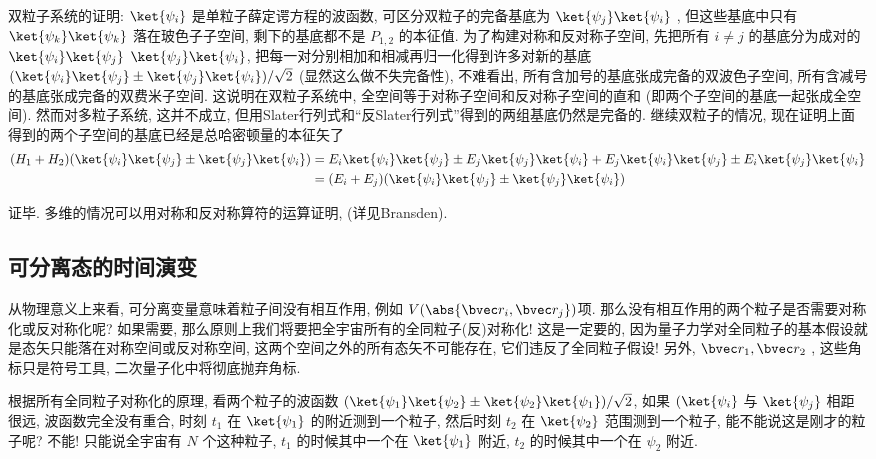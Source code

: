 双粒子系统的证明: $\ket{\psi_i}$ 是单粒子薛定谔方程的波函数, 可区分双粒子的完备基底为 $\ket{\psi_j}\ket{\psi_i}$ , 但这些基底中只有 $\ket{\psi_k}\ket{\psi_k}$ 落在玻色子子空间, 剩下的基底都不是 $P_{1,2}$ 的本征值. 为了构建对称和反对称子空间, 先把所有 $i \ne j$ 的基底分为成对的 $\ket{\psi_i}\ket{\psi_j}$ $\ket{\psi_j}\ket{\psi_i}$, 把每一对分别相加和相减再归一化得到许多对新的基底 $(\ket{\psi_i}\ket{\psi_j} \pm \ket{\psi_j}\ket{\psi_i})/\sqrt{2}$ (显然这么做不失完备性), 不难看出, 所有含加号的基底张成完备的双波色子空间, 所有含减号的基底张成完备的双费米子空间. 这说明在双粒子系统中, 全空间等于对称子空间和反对称子空间的直和 (即两个子空间的基底一起张成全空间). 然而对多粒子系统, 这并不成立, 但用Slater行列式和“反Slater行列式”得到的两组基底仍然是完备的. 继续双粒子的情况, 现在证明上面得到的两个子空间的基底已经是总哈密顿量的本征矢了
\begin{equation}
\begin{aligned}
(H_1 + H_2) (\ket{\psi_i}\ket{\psi_j} \pm \ket{\psi_j}\ket{\psi_i}) &= E_i \ket{\psi_i}\ket{\psi_j} \pm E_j \ket{\psi_j}\ket{\psi_i} + E_j \ket{\psi_i}\ket{\psi_j} \pm E_i \ket{\psi_j}\ket{\psi_i}\\
&= (E_i + E_j) (\ket{\psi_i}\ket{\psi_j} \pm \ket{\psi_j}\ket{\psi_i})
\end{aligned}
\end{equation}

证毕.
多维的情况可以用对称和反对称算符的运算证明, (详见Bransden).

\subsection{可分离态的时间演变}
从物理意义上来看, 可分离变量意味着粒子间没有相互作用, 例如 $V(\abs{\bvec r_i, \bvec r_j})$项.
那么没有相互作用的两个粒子是否需要对称化或反对称化呢? 如果需要, 那么原则上我们将要把全宇宙所有的全同粒子(反)对称化! 这是一定要的, 因为量子力学对全同粒子的基本假设就是态矢只能落在对称空间或反对称空间, 这两个空间之外的所有态矢不可能存在, 它们违反了全同粒子假设! 另外, $\bvec r_1, \bvec r_2$ , 这些角标只是符号工具, 二次量子化中将彻底抛弃角标.

根据所有全同粒子对称化的原理, 看两个粒子的波函数 $(\ket{\psi_1}\ket{\psi_2} \pm \ket{\psi_2}\ket{\psi_1})/\sqrt{2}$, 如果 $(\ket{\psi_i}$ 与 $\ket{\psi_j}$ 相距很远, 波函数完全没有重合, 时刻 $t_1$ 在 $\ket{\psi_1}$ 的附近测到一个粒子, 然后时刻 $t_2$ 在 $\ket{\psi_2}$ 范围测到一个粒子, 能不能说这是刚才的粒子呢? 不能! 只能说全宇宙有 $N$ 个这种粒子, $t_1$ 的时候其中一个在 $\ket{\psi_1}$ 附近, $t_2$ 的时候其中一个在 $\psi_2$ 附近.

